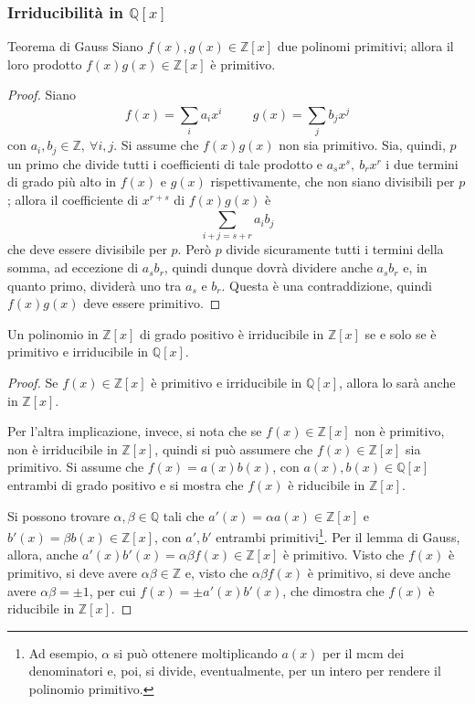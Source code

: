 \documentclass[11pt, a4paper]{scrartcl}
\theoremstyle{definition}
\numberwithin{esempio}{section}
\theoremstyle{definition}
\numberwithin{obs}{section}
\numberwithin{nota}{section}
\numberwithin{equation}{subsection}
\begin{document}
\subsubsection{Irriducibilit\`a in $\mathbb{Q}[x]$}

\begin{lemma}
	{Teorema di Gauss}{}
	Siano $f(x), g(x) \in \mathbb{Z}[x]$ due polinomi primitivi; allora il loro prodotto $f(x)g(x) \in \mathbb{Z}[x]$ \`e primitivo.
	\begin{proof}
		Siano
		\[
		f(x) = \sum_{i}^{} a_i x^i \hspace{1cm}g(x) = \sum_{j}^{} b_j x^j
		\] 
		con $a_i, b_j \in \mathbb{Z}, \ \forall i,j$.
		Si assume che $f(x)g(x)$ non sia primitivo.
		Sia, quindi, $p$ un primo che divide tutti i coefficienti di tale prodotto e $a_s x^s, \ b_r x^r$ i due termini di grado pi\`u alto in $f(x)$ e $g(x)$ rispettivamente, che non siano divisibili per $p$; allora il coefficiente di $x^{r+s} $ di $f(x)g(x)$ \`e
		\[
		\sum_{i+j = s+r}^{} a_i b_j
		\] 
		che deve essere divisibile per $p$.
		Per\`o $p$ divide sicuramente tutti i termini della somma, ad eccezione di $a_s b_r$, quindi dunque dovr\`a dividere anche $a_s b_r$ e, in quanto primo, divider\`a uno tra $a_s$ e $b_r$.
		Questa \`e una contraddizione, quindi $f(x) g(x)$ deve essere primitivo.
	\end{proof}
\end{lemma}
\begin{corollario}
	{}{}
	Un polinomio in $\mathbb{Z}[x]$ di grado positivo \`e irriducibile in $\mathbb{Z}[x]$ se e solo se \`e primitivo e irriducibile in $\mathbb{Q}[x]$.
	\begin{proof}
		Se $f(x) \in \mathbb{Z}[x]$ \`e primitivo e irriducibile in $\mathbb{Q}[x]$, allora lo sar\`a anche in $\mathbb{Z}[x]$.

		Per l'altra implicazione, invece, si nota che se $f(x) \in \mathbb{Z}[x]$ non \`e primitivo, non \`e irriducibile in $\mathbb{Z}[x]$, quindi si pu\`o assumere che $f(x) \in \mathbb{Z}[x]$ sia primitivo.
		Si assume che $f(x) = a(x) b(x)$, con $a(x),b(x) \in \mathbb{Q}[x]$ entrambi di grado positivo e si mostra che $f(x)$ \`e riducibile in $\mathbb{Z}[x]$.

		Si possono trovare $\alpha ,\beta \in \mathbb{Q}$ tali che $a'(x) = \alpha  a(x) \in \mathbb{Z}[x]$ e $b'(x) = \beta b(x) \in \mathbb{Z}[x]$, con $a',b'$ entrambi primitivi\footnote{Ad esempio, $\alpha $ si pu\`o ottenere moltiplicando $a(x)$ per il mcm dei denominatori e, poi, si divide, eventualmente, per un intero per rendere il polinomio primitivo.}. 
		Per il lemma di Gauss, allora, anche $a'(x) b'(x) = \alpha  \beta  f(x) \in \mathbb{Z}[x]$ \`e primitivo.
		Visto che $f(x)$ \`e primitivo, si deve avere $\alpha \beta  \in \mathbb{Z}$ e, visto che $\alpha \beta f(x)$ \`e primitivo, si deve anche avere $\alpha \beta = \pm 1$, per cui $f(x) = \pm a'(x) b'(x)$, che dimostra che $f(x)$ \`e riducibile in $\mathbb{Z}[x]$.
	\end{proof}
\end{corollario}
\newpage
\end{document}
